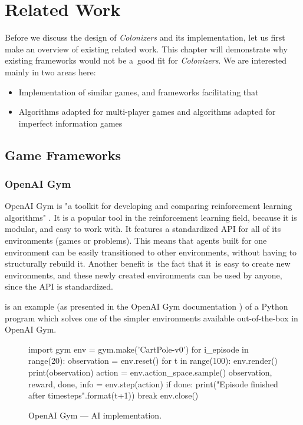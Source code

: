 \chapter{Related Work}

Before we discuss the design of \emph{Colonizers} and its implementation,
let us first make an overview of existing related work. This chapter will
demonstrate why existing frameworks would not be a~good fit for \emph{Colonizers}.
We are interested mainly in two areas here:
\begin{itemize}
    \item Implementation of similar games, and frameworks facilitating that
    \item Algorithms adapted for multi-player games and algorithms adapted
        for imperfect information games
\end{itemize}

\section{Game Frameworks}

\subsection{OpenAI Gym}

OpenAI Gym is "a toolkit for developing and comparing reinforcement learning algorithms"
\cite{Openaigym}. It is a popular tool in the reinforcement learning field,
because it is modular, and easy to work with. It features a standardized API for
all of its environments (games or problems). This means that agents built for one
environment can be easily transitioned to other environments, without having to
structurally rebuild it. Another benefit is~the fact that it~is easy to create
new environments, and these newly created environments can be used by anyone,
since the API is standardized.

 is an example (as presented in the OpenAI Gym documentation
\cite{Openaigym}) of a Python program which solves one of the simpler environments
available out-of-the-box in OpenAI Gym.

\begin{figure}[h!]
\begin{code}
import gym
env = gym.make('CartPole-v0')
for i_episode in range(20):
    observation = env.reset()
    for t in range(100):
        env.render()
        print(observation)
        action = env.action_space.sample()
        observation, reward, done, info = env.step(action)
        if done:
            print("Episode finished after {} timesteps".format(t+1))
            break
env.close()
\end{code}
\caption{OpenAI Gym --- AI implementation.}\label{figrw:gym}
\end{figure}


